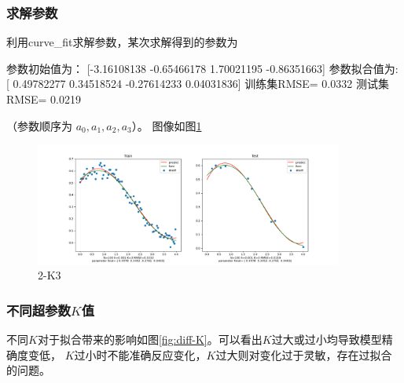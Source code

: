  \subsubsection{求解参数}
 利用curve\_fit求解参数，某次求解得到的参数为
 \begin{python}
参数初始值为： [-3.16108138 -0.65466178  1.70021195 -0.86351663]
参数拟合值为: [ 0.49782277  0.34518524 -0.27614233  0.04031836]
训练集RMSE= 0.0332
测试集RMSE= 0.0219
 \end{python}
（参数顺序为 $a_0, a_1,a_2,a_3$）。
 图像如图\ref{fig:2-K3}
 \begin{figure}[H]
    \begin{center}
        \includegraphics[width=0.9\textwidth]{img/2-K3N100.png}
    \end{center}
   \caption[]{2-K3}
    \label{fig:2-K3}
\end{figure} 

\subsubsection{不同超参数$K$值}

不同$K$对于拟合带来的影响如图\ref{fig:diff-K}。可以看出$K$过大或过小均导致模型精确度变低，
$K$过小时不能准确反应变化，$K$过大则对变化过于灵敏，存在过拟合的问题。

